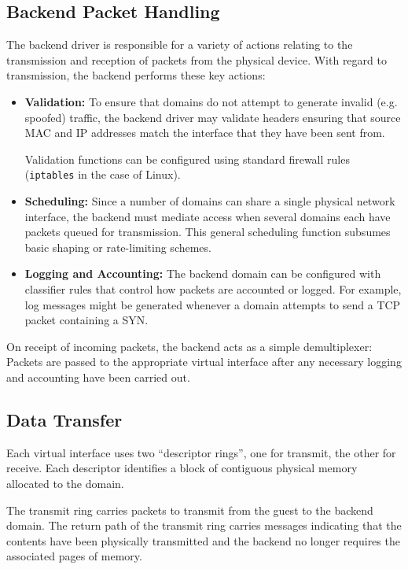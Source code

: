 \subsection{Backend Packet Handling}

The backend driver is responsible for a variety of actions relating to
the transmission and reception of packets from the physical device.
With regard to transmission, the backend performs these key actions:

\begin{itemize}
\item {\bf Validation:} To ensure that domains do not attempt to
  generate invalid (e.g. spoofed) traffic, the backend driver may
  validate headers ensuring that source MAC and IP addresses match the
  interface that they have been sent from.

  Validation functions can be configured using standard firewall rules
  ({\small{\tt iptables}} in the case of Linux).
  
\item {\bf Scheduling:} Since a number of domains can share a single
  physical network interface, the backend must mediate access when
  several domains each have packets queued for transmission.  This
  general scheduling function subsumes basic shaping or rate-limiting
  schemes.
  
\item {\bf Logging and Accounting:} The backend domain can be
  configured with classifier rules that control how packets are
  accounted or logged.  For example, log messages might be generated
  whenever a domain attempts to send a TCP packet containing a SYN.
\end{itemize}

On receipt of incoming packets, the backend acts as a simple
demultiplexer: Packets are passed to the appropriate virtual interface
after any necessary logging and accounting have been carried out.

\subsection{Data Transfer}

Each virtual interface uses two ``descriptor rings'', one for
transmit, the other for receive.  Each descriptor identifies a block
of contiguous physical memory allocated to the domain.

The transmit ring carries packets to transmit from the guest to the
backend domain.  The return path of the transmit ring carries messages
indicating that the contents have been physically transmitted and the
backend no longer requires the associated pages of memory.

